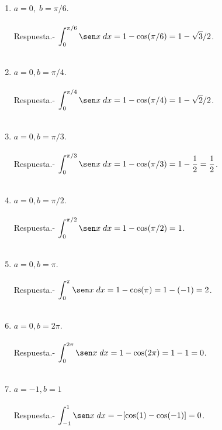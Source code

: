 \begin{enumerate}
    \begin{enumerate}[\bfseries (a)]

	\item $a=0,\; b=\pi/6.$\\\\
	    Respuesta.-\; $\displaystyle\int_0^{\pi/6}\sen x \; dx = 1-\cos(\pi/6) = 1-\sqrt{3}/2$.\\\\

	\item $a=0,b=\pi/4.$\\\\
	    Respuesta.-\; $\displaystyle\int_0^{\pi/4}\sen x \; dx = 1-\cos(\pi/4) = 1-\sqrt{2}/2$.\\\\

	\item $a=0,b=\pi/3.$\\\\
	    Respuesta.-\; $\displaystyle\int_0^{\pi/3}\sen x \; dx = 1-\cos(\pi/3) = 1-\dfrac{1}{2}=\dfrac{1}{2}$.\\\\

	\item $a=0,b=\pi/2.$\\\\
	    Respuesta.-\; $\displaystyle\int_0^{\pi/2}\sen x \; dx = 1-\cos(\pi/2) = 1$.\\\\

	\item $a=0,b=\pi.$\\\\
	    Respuesta.-\; $\displaystyle\int_0^{\pi}\sen x \; dx = 1-\cos(\pi) = 1-(-1) = 2$.\\\\

	\item $a=0,b=2\pi.$\\\\
	    Respuesta.-\; $\displaystyle\int_0^{2\pi}\sen x \; dx = 1-\cos(2\pi) = 1-1 = 0$.\\\\

	\item $a=-1,b=1$\\\\
	    Respuesta.-\; $\displaystyle\int_{-1}^{1}\sen x \; dx = -[\cos(1) - \cos( -1)] = 0$.\\\\


\end{enumerate}
\end{enumerate}
